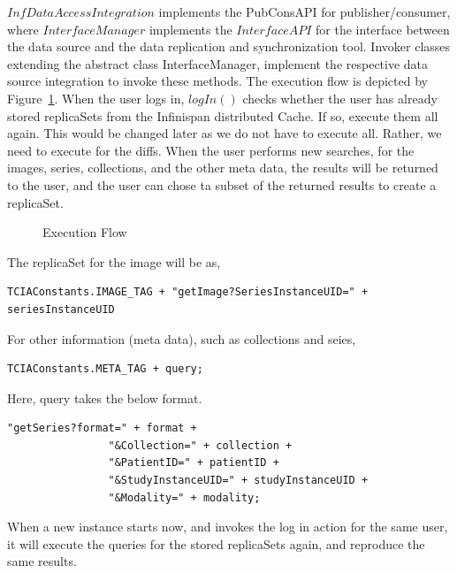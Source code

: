 \documentclass[conference]{IEEEtran}
\begin{document}
$InfDataAccessIntegration$ implements the PubConsAPI for publisher/consumer, where $InterfaceManager$ implements the $InterfaceAPI$ for the interface between the data source and the data replication and synchronization tool. Invoker classes extending the abstract class InterfaceManager, implement the respective data source integration to invoke these methods. The execution flow is depicted by Figure~\ref{fig:execution}. When the user logs in, $logIn()$ checks whether the user has already stored replicaSets from the Infinispan distributed Cache. If so, execute them all again. This would be changed later as we do not have to execute all. Rather, we need to execute for the diffs. When the user performs new searches, for the images, series, collections, and the other meta data, the results will be returned to the user, and the user can chose ta subset of the returned results to create a replicaSet.
\begin{figure}[!htbp]
\begin{center}
\end{center}
 \caption{Execution Flow}
 \label{fig:execution}
\end{figure}
The replicaSet for the image will be as,
\begin{lstlisting}  
TCIAConstants.IMAGE_TAG + "getImage?SeriesInstanceUID=" + seriesInstanceUID
\end{lstlisting}  
For other information (meta data), such as collections and seies,
\begin{lstlisting}  
TCIAConstants.META_TAG + query;
\end{lstlisting}  

Here, query takes the below format. 
\begin{lstlisting}  
"getSeries?format=" + format +
                "&Collection=" + collection +
                "&PatientID=" + patientID +
                "&StudyInstanceUID=" + studyInstanceUID +
                "&Modality=" + modality;
\end{lstlisting}  
When a new instance starts now, and invokes the log in action for the same user, it will execute the queries for the stored replicaSets again, and reproduce the same results.
\end{document}
